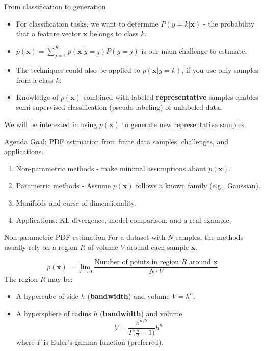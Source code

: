 \documentclass{beamer}
\newcommand{\x}{\mathbf{x}}
\begin{document}
\begin{frame}{From classification to generation}
\begin{itemize}
\item For classification tasks, we want to determine $P(y = k|\x)$ -
  the probability that a feature vector $\x$ belongs to class $k$.
  \vspace{0.5cm}
\item $p(\x) = \sum_{j=1}^K p(\x|y = j)P(y = j)$ is \alert{our main
  challenge} to estimate.
  \vspace{0.5cm}
\item The techniques could also be applied to $p(\x|y = k)$, if you
  use only samples from a class $k$.
  \vspace{0.5cm}
\item Knowledge of $p(\x)$ combined with labeled \textbf{representative} samples enables semi-supervised classification (pseudo-labeling) of unlabeled data.
\end{itemize}
We will be interested in using $p(\x)$ to \alert{generate} new representative
samples.
\end{frame}

\begin{frame}{Agenda}
  Goal: PDF estimation from \alert{finite data samples}, challenges,
  and applications.
  \vspace{0.5cm}
\begin{enumerate}
\item Non-parametric methods - make minimal assumptions about $p(\x)$.
  \vspace{0.5cm}
\item Parametric methods - Assume $p(\x)$ follows a known family (e.g., Gaussian).
  \vspace{0.5cm}
\item Manifolds and curse of dimensionality.  
  \vspace{0.5cm}
\item Applications: KL divergence, model comparison, and a real example.
\end{enumerate}
\end{frame}

\begin{frame}{Non-parametric PDF estimation}
For a dataset with $N$ samples, the methods usually rely on a region
$R$ of volume $V$ around each sample $\x$.

$$p(\x) = \lim_{V \to 0} \frac{\text{Number of points in region } R
  \text{ around } \x}{N\cdot V}$$
\vspace{0.5cm}
The region $R$ may be:
\begin{itemize}
\item A hypercube of side $h$ (\textbf{bandwidth}) and volume $V=h^n$.
\item A hypersphere of radius $h$ (\textbf{bandwidth}) and volume
$$ V={\frac {\pi ^{n/2}}{\Gamma {\bigl (}{\tfrac {n}{2}}+1{\bigr )}}}h^{n} $$ 
where $\Gamma$ is Euler's gamma function \alert{(preferred)}.
\end{itemize}
\end{frame}
\end{document}
